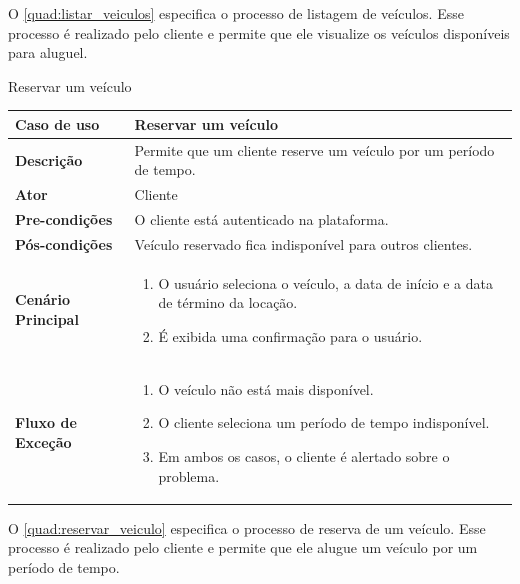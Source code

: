 O \autoref{quad:listar_veiculos} especifica o processo de listagem de veículos. Esse processo é realizado pelo cliente e permite que ele visualize os veículos disponíveis para aluguel.

\begin{quadro}[H]
    \centering
    \caption{Reservar um veículo}
    \label{quad:reservar_veiculo}
    \begin{tabular}{|p{1.2in}|p{3.5in}|}
    \hline
    
    \textbf{Caso de uso} & Reservar um veículo \\ \hline
    \textbf{Descrição} & Permite que um cliente reserve um veículo por um período de tempo. \\ \hline
    \textbf{Ator} & Cliente \\ \hline
    \textbf{Pre-condições} & O cliente está autenticado na plataforma. \\ \hline
    \textbf{Pós-condições} & Veículo reservado fica indisponível para outros clientes. \\ \hline
    \textbf{Cenário Principal} & \begin{enumerate}
        \item O usuário seleciona o veículo, a data de início e a data de término da locação.
        \item É exibida uma confirmação para o usuário.
    \end{enumerate}  \\ \hline
    \textbf{Fluxo de Exceção} & \begin{enumerate}
        \item O veículo não está mais disponível.
        \item O cliente seleciona um período de tempo indisponível.  
        \item Em ambos os casos, o cliente é alertado sobre o problema.
    \end{enumerate}  \\ \hline
    \end{tabular} 
\end{quadro}

O \autoref{quad:reservar_veiculo} especifica o processo de reserva de um veículo. Esse processo é realizado pelo cliente e permite que ele alugue um veículo por um período de tempo.

